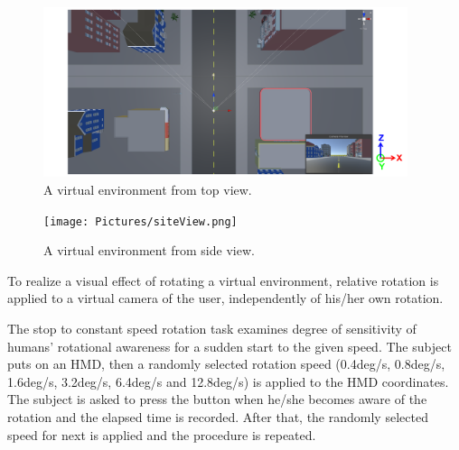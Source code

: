 \begin{figure}[H]\centering
	\includegraphics[width=0.95\textwidth]{Pictures/topView.png}%
	\caption{A virtual environment from top view.}\label{fig:topView}%
\end{figure}

\begin{figure}[H]\centering
	\texttt{[image: Pictures/siteView.png]}%
	\caption{A virtual environment from side view.}\label{fig:sideView}%
\end{figure}
\newpage

To realize a visual effect of rotating a virtual environment, relative rotation is applied to a virtual camera of the user, independently of his/her own rotation.

The stop to constant speed rotation task examines degree of sensitivity of humans' rotational awareness for a sudden start to the given speed. The subject puts on an HMD, then a randomly selected rotation speed (0.4deg/s, 0.8deg/s, 1.6deg/s, 3.2deg/s, 6.4deg/s and 12.8deg/s) is applied to the HMD coordinates. The subject is asked to press the button when he/she becomes aware of the rotation and the elapsed time is recorded. After that, the randomly selected speed for next is applied and the procedure is repeated.

